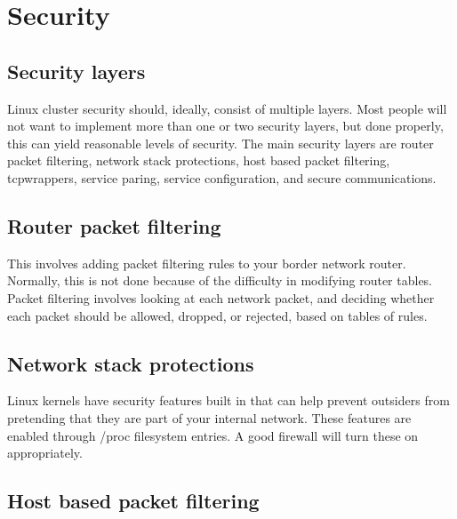 %
%
%

\section{Security}
\label{app:security}

\subsection{Security layers}
Linux cluster security should, ideally, consist of multiple layers.
Most people will not want to implement more than one or two security
layers, but done properly, this can yield reasonable levels of security.
The main security layers are router packet filtering, 
network stack protections, host based packet filtering, tcpwrappers,
service paring, service configuration, and secure communications.

\subsection{Router packet filtering}

This involves adding packet filtering rules to your border network router.
Normally, this is not done because of the difficulty in modifying router
tables. Packet filtering involves looking at each network packet,
and deciding whether each packet should be allowed, dropped, or rejected,
based on tables of rules.

\subsection{Network stack protections}

Linux kernels have security features built in that can help prevent 
outsiders from pretending that they are part of your internal network.
These features are enabled through /proc filesystem entries.
A good firewall will turn these on appropriately.

\subsection{Host based packet filtering}

